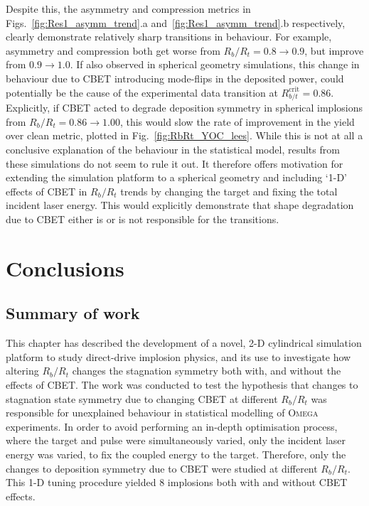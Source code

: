 Despite this, the asymmetry and compression metrics in Figs.~\ref{fig:Res1_asymm_trend}.a and~\ref{fig:Res1_asymm_trend}.b respectively, clearly demonstrate relatively sharp transitions in behaviour.
For example, asymmetry and compression both get worse from $R_b/R_t=0.8\rightarrow0.9$, but improve from $0.9\rightarrow1.0$.
If also observed in spherical geometry simulations, this change in behaviour due to \ac{CBET} introducing mode-flips in the deposited power, could potentially be the cause of the experimental data transition at $R_{b/t}^{\text{crit}}=0.86$.
Explicitly, if \ac{CBET} acted to degrade deposition symmetry in spherical implosions from $R_b/R_t=0.86\rightarrow1.00$, this would slow the rate of improvement in the yield over clean metric, plotted in Fig.~\ref{fig:RbRt_YOC_lees}.
While this is not at all a conclusive explanation of the behaviour in the statistical model, results from these simulations do not seem to rule it out.
It therefore offers motivation for extending the simulation platform to a spherical geometry and including `1-D' effects of \ac{CBET} in $R_b/R_t$ trends by changing the target and fixing the total incident laser energy.
This would explicitly demonstrate that shape degradation due to \ac{CBET} either is or is not responsible for the transitions.

\section{Conclusions}%
\label{sec:Res1_Conclusions}

\subsection{Summary of work}%
\label{sec:Res1_Summary}

This chapter has described the development of a novel, 2-D cylindrical simulation platform to study direct-drive implosion physics, and its use to investigate how altering $R_b/R_t$ changes the stagnation symmetry both with, and without the effects of \ac{CBET}.
The work was conducted to test the hypothesis that changes to stagnation state symmetry due to changing \ac{CBET} at different $R_b/R_t$ was responsible for unexplained behaviour in statistical modelling of \textsc{Omega} experiments.
In order to avoid performing an in-depth optimisation process, where the target and pulse were simultaneously varied, only the incident laser energy was varied, to fix the coupled energy to the target.
Therefore, only the changes to deposition symmetry due to \ac{CBET} were studied at different $R_b/R_t$.
This 1-D tuning procedure yielded 8 implosions both with and without \ac{CBET} effects.

